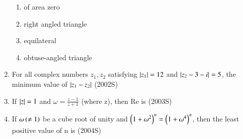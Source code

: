 \documentclass[journal,12pt,twocolumn]{IEEEtran}
\theoremstyle{remark}
\begin{document}
\begin{enumerate}[start=6]
\begin{enumerate}
\item of area zero
\item right angled triangle
\item equilateral
\item obtuse-angled triangle
\end{enumerate}
\item For all complex numbers $z_1,z_2$ satisfying $\left\vert z_1\right\vert=12$ and $\left\vert z_2-3-i\right\vert=5$, the minimum value of $\left\vert z_1-z_2\right\vert$
\hfill{(2002S)}
\begin{enumerate}
\end{enumerate}
\item If $\left\vert z\right\vert=1$ and $\omega=\frac{z-1}{z+1}$ (where z), then Re\brak{\omega} is
\hfill{(2003S)}
\begin{enumerate}
\end{enumerate}
\item If $\omega\left(\neq1\right)$ be a cube root of unity and $\left(1+\omega^2\right)^n = \left(1+\omega^4\right)^n$, then the least positive value of n is
\hfill{(2004S)}
\begin{enumerate}
\end{enumerate}
\end{enumerate}
\end{document}
